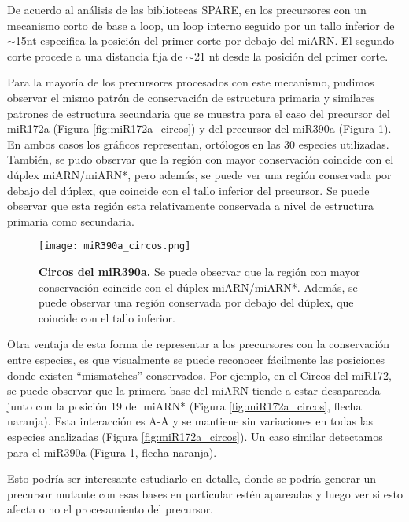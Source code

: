 De acuerdo al análisis de las bibliotecas SPARE, en los precursores con un mecanismo corto de base a loop, un loop interno seguido por un tallo inferior de $\sim$15nt especifica la posición del primer corte por debajo del miARN.
El segundo corte procede a una distancia fija de $\sim$21 nt desde la posición del primer corte.

Para la mayoría de los precursores procesados con este mecanismo, pudimos observar el mismo patrón de conservación de estructura primaria y similares patrones de estructura secundaria que se muestra para el caso del precursor del miR172a (Figura \ref{fig:miR172a_circos}) y del precursor del miR390a (Figura \ref{fig:miR390a_circos}).
En ambos casos los gráficos representan, ortólogos en las 30 especies utilizadas.
También, se pudo observar que la región con mayor conservación coincide con el dúplex miARN/miARN*, pero además, se puede ver una región conservada por debajo del dúplex, que coincide con el tallo inferior del precursor.
Se puede observar que esta región esta relativamente conservada a nivel de estructura primaria como secundaria.

\begin{figure}[htbp!] 
    \centering    
    \texttt{[image: miR390a\_circos.png]}
    \caption[Circos del miR172a]{
    \textbf{Circos del miR390a.}
    Se puede observar que la región con mayor conservación coincide con el dúplex miARN/miARN*.
    Además, se puede observar una región conservada por debajo del dúplex, que coincide con el tallo inferior.
    }
     \label{fig:miR390a_circos}
\end{figure}

Otra ventaja de esta forma de representar a los precursores con la conservación entre especies, es que visualmente se puede reconocer fácilmente las posiciones donde existen ``mismatches'' conservados. 
Por ejemplo, en el Circos del miR172, se puede observar que la primera base del miARN tiende a estar desapareada junto con la posición 19 del miARN* (Figura \ref{fig:miR172a_circos}, flecha naranja). 
Esta interacción es A-A y se mantiene sin variaciones en todas las especies analizadas (Figura \ref{fig:miR172a_circos}).
Un caso similar detectamos para el miR390a (Figura \ref{fig:miR390a_circos}, flecha naranja).

Esto podría ser interesante estudiarlo en detalle, donde se podría generar un precursor mutante con esas bases en particular estén apareadas y luego ver si esto afecta o no el procesamiento del precursor.  
\newpage


